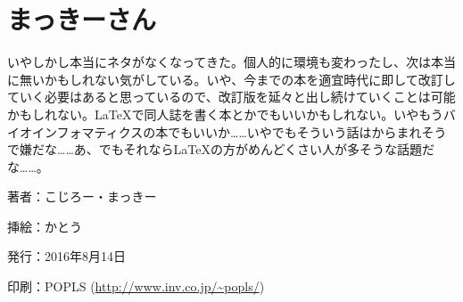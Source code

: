 \documentclass[9pt,b5paper,tombo,openany]{jsbook}
\begin{document}
\section*{まっきーさん}

いやしかし本当にネタがなくなってきた。個人的に環境も変わったし、次は本当に無いかもしれない気がしている。いや、今までの本を適宜時代に即して改訂していく必要はあると思っているので、改訂版を延々と出し続けていくことは可能かもしれない。\LaTeX で同人誌を書く本とかでもいいかもしれない。いやもうバイオインフォマティクスの本でもいいか……いやでもそういう話はからまれそうで嫌だな……あ、でもそれなら\LaTeX の方がめんどくさい人が多そうな話題だな……。



\newpage

\thispagestyle{empty}
\begin{flushright}
	\begin{minipage}{0.5\paperwidth}
		\begin{description}
			\item{著者：}こじろー・まっきー
			\item{挿絵：}かとう
			\item{発行：}2016年8月14日
			\item{印刷：}POPLS (\url{http://www.inv.co.jp/~popls/})
		\end{description}
	\end{minipage}
\end{flushright}
\end{document}
